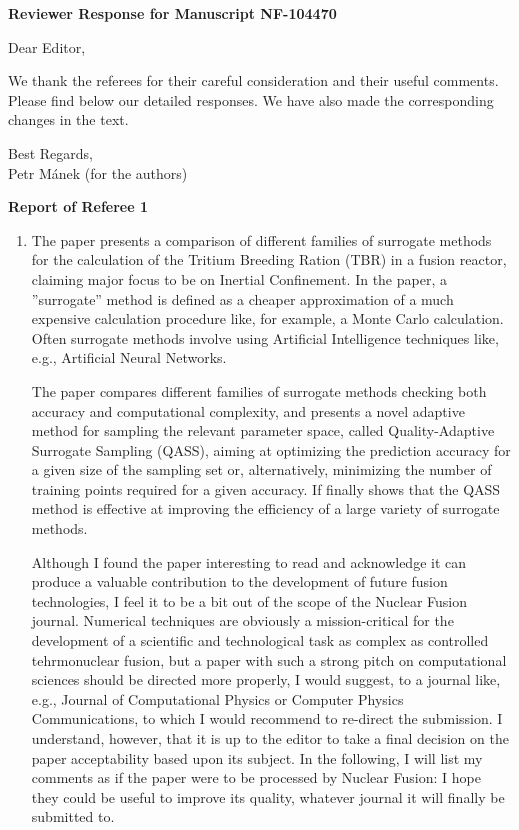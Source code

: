 \documentclass[12pt]{article}
\date{\today}
\begin{document}
\begin{center}
\bf Reviewer Response for Manuscript NF-104470
\end{center}

\bigskip

\noindent
Dear Editor,

\bigskip
\noindent
We thank the referees for their careful consideration and their useful comments. Please find below our detailed responses. We have also made the corresponding changes in the text.

\bigskip
\noindent
Best Regards,\\
Petr Mánek (for the authors)

\bigskip
\noindent
{\bf Report of Referee 1}

\begin{enumerate}
\item The paper presents a comparison of different families of surrogate methods for the calculation of the Tritium Breeding Ration (TBR) in a fusion reactor, claiming major focus to be on Inertial Confinement. In the paper, a ”surrogate” method is defined as a cheaper approximation of a much expensive calculation procedure like, for example, a Monte Carlo calculation. Often surrogate methods involve using Artificial Intelligence techniques like, e.g., Artificial Neural Networks.

The paper compares different families of surrogate methods checking both accuracy and computational complexity, and presents a novel adaptive method for sampling the relevant parameter space, called Quality-Adaptive Surrogate Sampling (QASS), aiming at optimizing the prediction accuracy
for a given size of the sampling set or, alternatively, minimizing the number of training points required for a given accuracy. If finally shows that the QASS method is effective at improving the efficiency of a large variety of surrogate methods.

Although I found the paper interesting to read and acknowledge it can produce a valuable contribution to the development of future fusion technologies, I feel it to be a bit out of the scope of the Nuclear Fusion journal. Numerical techniques are obviously a mission-critical for the development of a scientific and technological task as complex as controlled tehrmonuclear fusion, but a paper with such a strong pitch on computational sciences should be directed more properly, I would suggest, to a journal like, e.g., Journal of Computational Physics or Computer Physics Communications, to which I would recommend to re-direct the submission. I understand, however, that it is up to the editor to take a final decision on the paper acceptability based upon its subject. In the following, I will list my comments as if the paper were to be processed by Nuclear Fusion: I hope they could be useful to improve its quality, whatever journal it will finally be submitted to.


\end{enumerate}
\end{document}
